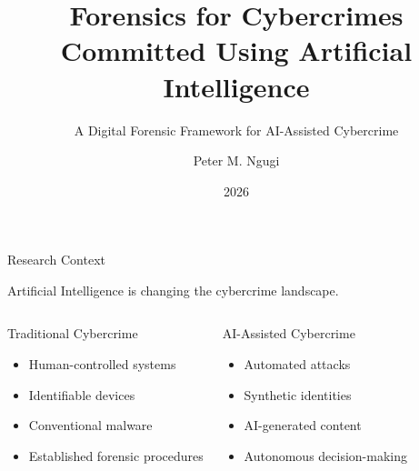 \documentclass[aspectratio=169,11pt]{beamer}
\title[
AI Cybercrime Forensics
]
{
	Forensics for Cybercrimes Committed Using Artificial Intelligence
}
\subtitle{
	A Digital Forensic Framework for AI-Assisted Cybercrime
}
\author{
	Peter M. Ngugi
}
\institute{
	PhD in Computer Science\\
	Zetech University
}
\date{
	2026
}
\begin{document}
	
	
	\begin{frame}[plain]
		
		\titlepage
		
	\end{frame}
	
	
	\begin{frame}{Research Context}
		
		Artificial Intelligence is changing the cybercrime landscape.
		
		\vspace{0.4cm}
		
		\begin{columns}
			
			
			\begin{block}{Traditional Cybercrime}
				\begin{itemize}
					\item Human-controlled systems
					\item Identifiable devices
					\item Conventional malware
					\item Established forensic procedures
				\end{itemize}
			\end{block}
			
			
			\begin{block}{AI-Assisted Cybercrime}
				\begin{itemize}
					\item Automated attacks
					\item Synthetic identities
					\item AI-generated content
					\item Autonomous decision-making
				\end{itemize}
			\end{block}
			
		\end{columns}
		
	\end{frame}
	
	
\end{document}
